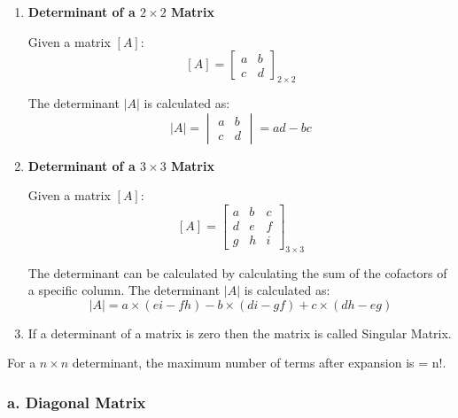 \begin{enumerate}
    \item {\textbf{Determinant of a $2 \times 2$ Matrix}}

    Given a matrix $[A]$:
    $$ [A] = \begin{bmatrix} a & b \\ c & d \end{bmatrix}_{2 \times 2} $$

    The determinant $|A|$ is calculated as:
    $$ |A| = \begin{vmatrix} a & b \\ c & d \end{vmatrix} = ad - bc $$

    \item {\textbf{Determinant of a $3 \times 3$ Matrix }}

    Given a matrix $[A]$:
    $$  [A] = \begin{bmatrix}
        a & b & c \\
        d & e & f \\
        g & h & i
        \end{bmatrix}_{3 \times 3}
    $$

    The determinant can be calculated by calculating the sum of the cofactors of a specific column. The determinant $|A|$ is calculated as:
    $$ |A| = a \times (ei-fh) - b \times (di-gf) + c \times (dh-eg) $$

    \item If a determinant of a matrix is zero then the matrix is called Singular Matrix.
\end{enumerate}

\begin{notebox}{}
    For a $n \times n$ determinant, the maximum number of terms after expansion is = n!.
\end{notebox}

\subsubsection*{a. Diagonal Matrix}

